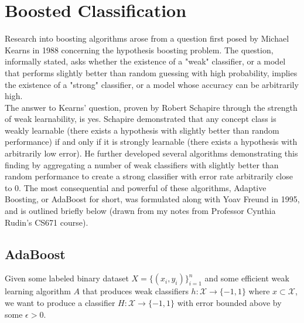 \documentclass[12pt, reqno]{amsart}
\newcommand{\calX}{\mathcal X}
\begin{document}
\section*{Boosted Classification}

Research into boosting algorithms arose from a question first posed by Michael Kearns in 1988 concerning the hypothesis boosting problem. The question, informally stated, asks whether the existence of a "weak" classifier, or a model that performs slightly better than random guessing with high probability, implies the existence of a "strong" classifier, or a model whose accuracy can be arbitrarily high. \\

The answer to Kearns' question, proven by Robert Schapire through the strength of weak learnability, is yes. Schapire demonstrated that any concept class is weakly learnable (there exists a hypothesis with slightly better than random performance) if and only if it is strongly learnable (there exists a hypothesis with arbitrarily low error). He further developed several algorithms demonstrating this finding by aggregating a number of weak classifiers with slightly better than random performance to create a strong classifier with error rate arbitrarily close to 0. The most consequential and powerful of these algorithms, Adaptive Boosting, or AdaBoost for short, was formulated along with Yoav Freund in 1995, and is outlined briefly below (drawn from my notes from Professor Cynthia Rudin's CS671 course).

\newpage
\subsection*{AdaBoost}

Given some labeled binary dataset $X = \{(x_i, y_i)\}_{i=1}^n$ and some efficient weak learning algorithm $A$ that produces weak classifiers $h: \calX \to \{-1, 1\}$ where $x \subset \calX$, we want to produce a classifier $H: \calX \to \{-1, 1\}$ with error bounded above by some $\epsilon > 0$. \\
\end{document}
